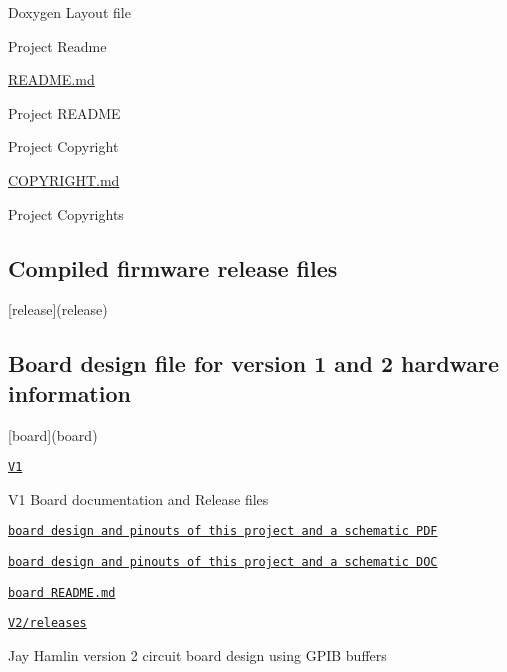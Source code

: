 \begin{DoxyItemize}
\begin{DoxyItemize}
\begin{DoxyItemize}
\item Doxygen Layout file
\end{DoxyItemize}
\end{DoxyItemize}
\item Project Readme
\begin{DoxyItemize}
\item \hyperlink{md_README}{R\+E\+A\+D\+ME.md}
\begin{DoxyItemize}
\item Project R\+E\+A\+D\+ME
\end{DoxyItemize}
\end{DoxyItemize}
\item Project Copyright
\begin{DoxyItemize}
\item \hyperlink{COPYRIGHT_8md}{C\+O\+P\+Y\+R\+I\+G\+HT.md}
\begin{DoxyItemize}
\item Project Copyrights
\end{DoxyItemize}
\end{DoxyItemize}
\end{DoxyItemize}

\subsection*{Compiled firmware release files}


\begin{DoxyItemize}
\item \mbox{[}release\mbox{]}(release)
\end{DoxyItemize}

\subsection*{Board design file for version 1 and 2 hardware information}


\begin{DoxyItemize}
\item \mbox{[}board\mbox{]}(board)
\begin{DoxyItemize}
\item \href{board/V1}{\tt V1}
\begin{DoxyItemize}
\item V1 Board documentation and Release files
\item \href{board/V1/HP85Disk.pdf}{\tt board design and pinouts of this project and a schematic P\+DF}
\item \href{board/V1//HP85Disk.doc}{\tt board design and pinouts of this project and a schematic D\+OC}
\item \href{board/V1/HP85Disk.doc}{\tt board R\+E\+A\+D\+M\+E.\+md}
\end{DoxyItemize}
\item \href{V2/releases}{\tt V2/releases}
\begin{DoxyItemize}
\item Jay Hamlin version 2 circuit board design using G\+P\+IB buffers
\end{DoxyItemize}
\end{DoxyItemize}
\end{DoxyItemize}

